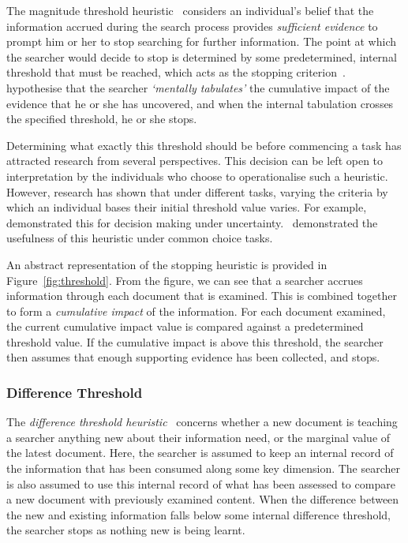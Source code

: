 The magnitude threshold heuristic~\citep{nickles1995judgment} considers an individual's belief that the information accrued during the search process provides \emph{sufficient evidence} to prompt him or her to stop searching for further information. The point at which the searcher would decide to stop is determined by some predetermined, internal threshold that must be reached, which acts as the stopping criterion~\citep{wald1948sequential_analysis, nickles1995judgment}.~\cite{gettys1979hypothesis} hypothesise that the searcher \emph{`mentally tabulates'} the cumulative impact of the evidence that he or she has uncovered, and when the internal tabulation crosses the specified threshold, he or she stops.

Determining what exactly this threshold should be before commencing a task has attracted research from several perspectives. This decision can be left open to interpretation by the individuals who choose to operationalise such a heuristic. However, research has shown that under different tasks, varying the criteria by which an individual bases their initial threshold value varies. For example,~\cite{busemeyer1982choice_behaviour} demonstrated this for decision making under uncertainty.~\cite{saad1996stopping} demonstrated the usefulness of this heuristic under common choice tasks.

An abstract representation of the stopping heuristic is provided in Figure~\ref{fig:threshold}. From the figure, we can see that a searcher accrues information through each document that is examined. This is combined together to form a \emph{cumulative impact} of the information. For each document examined, the current cumulative impact value is compared against a predetermined threshold value. If the cumulative impact is above this threshold, the searcher then assumes that enough supporting evidence has been collected, and stops.

\subsubsection{Difference Threshold}\label{sec:stopping_background:heuristics:difference}
The \emph{difference threshold heuristic}~\citep{nickles1995judgment} concerns whether a new document is teaching a searcher anything new about their information need, or the marginal value of the latest document. Here, the searcher is assumed to keep an internal record of the information that has been consumed along some key dimension. The searcher is also assumed to use this internal record of what has been assessed to compare a new document with previously examined content. When the difference between the new and existing information falls below some internal difference threshold, the searcher stops as nothing new is being learnt.

